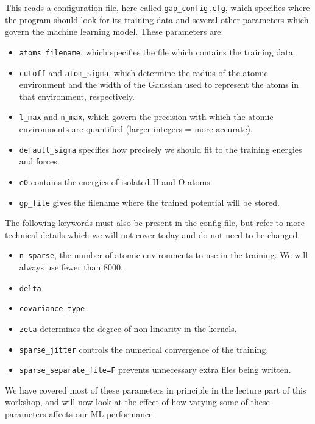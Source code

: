 \documentclass{article}
\begin{document}
This reads a configuration file, here called \verb|gap_config.cfg|, which specifies where the program should look for its training data and several other parameters which govern the machine learning model. These parameters are:
\begin{itemize}

\item \verb|atoms_filename|, which specifies the file which contains the training data.
\item \verb|cutoff| and \verb|atom_sigma|, which determine the radius of the atomic environment and the width of the Gaussian used to represent the atoms in that environment, respectively.
\item \verb|l_max| and \verb|n_max|, which govern the precision with which the atomic environments are quantified (larger integers = more accurate).
\item \verb|default_sigma| specifies how precisely we should fit to the training energies and forces.
\item \verb|e0| contains the energies of isolated H and O atoms.
\item \verb|gp_file| gives the filename where the trained potential will be stored.

\end{itemize}

The following keywords must also be present in the config file, but refer to more technical details which we will not cover today and do not need to be changed.

\begin{itemize}
\item \verb|n_sparse|, the number of atomic environments to use in the training. We will always use fewer than 8000.
\item \verb|delta|
\item \verb|covariance_type|
\item \verb|zeta| determines the degree of non-linearity in the kernels.
\item \verb|sparse_jitter| controls the numerical convergence of the training.
\item \verb|sparse_separate_file=F| prevents unnecessary extra files being written. 
\end{itemize}

We have covered most of these parameters in principle in the lecture part of this workshop, and will now look at the effect of how varying some of these parameters affects our ML performance.
\end{document}
